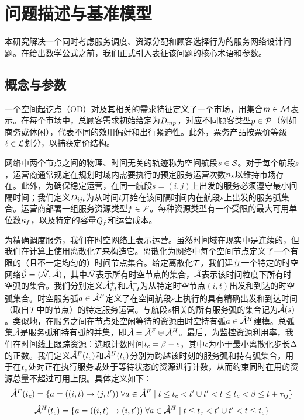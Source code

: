 \chapter{问题描述与基准模型}\label{sec:model_overview}

本研究解决一个同时考虑服务调度、资源分配和顾客选择行为的服务网络设计问题。在给出数学公式之前，我们正式引入表征该问题的核心术语和参数。

\section{概念与参数}

一个空间起讫点（OD）对及其相关的需求特征定义了一个市场，用集合$m \in \mathcal{M}$表示。在每个市场中，总顾客需求初始给定为$D_{mp}$，对应不同顾客类型$p \in \mathcal{P}$（例如商务或休闲），代表不同的效用偏好和出行紧迫性。此外，票务产品按票价等级$\ell \in \mathcal{L}$划分，以捕获定价结构。

网络中两个节点之间的物理、时间无关的轨迹称为空间航段$s \in \mathcal{S}$。对于每个航段$s$，运营商通常规定在规划时域内需要执行的预定服务运营次数$n_s$以维持市场存在。此外，为确保稳定运营，在同一航段$s=(i,j)$上出发的服务必须遵守最小间隔时间；我们定义$D_{ijt}$为从时间$t$开始在该间隔时间内在航段$s$上出发的服务弧集合。运营商部署一组服务资源类型$f \in \mathcal{F}$。每种资源类型有一个受限的最大可用单位数$\kappa_f$，以及特定的容量$Q_{f}$和运营成本。

为精确调度服务，我们在时空网络上表示运营。虽然时间域在现实中是连续的，但我们在计算上使用离散化$\mathcal{T}$来构造它。离散化为网络中每个空间节点定义了一个有限的（且不一定均匀的）时间节点集合。给定离散化$\mathcal{T}$，我们建立一个特定的时空网络$\hat{\mathcal{G}} = (\hat{\mathcal{N}}, \hat{\mathcal{A}})$，其中$\hat{\mathcal{N}}$表示所有时空节点的集合，$\hat{\mathcal{A}}$表示该时间粒度下所有时空弧的集合。我们分别定义${\hat{\mathcal{A}}^{+}_{i,t}}$和${\hat{\mathcal{A}}^{-}_{i,t}}$为从特定时空节点$(i, t)$出发和到达的时空弧集合。时空服务弧$a \in {\hat{\mathcal{A}}^F_{{}}}$定义了在空间航段$s$上执行的具有精确出发和到达时间（取自$\mathcal{T}$中的节点）的特定服务运营。与航段$s$相关的所有服务弧的集合记为$\hat{\mathcal{A}}(s)$。类似地，在服务之间在节点处空闲等待的资源由时空持有弧$a \in {\hat{\mathcal{A}}^H_{{}}}$建模。总弧集$\hat{\mathcal{A}}$是服务弧和持有弧的并集，即$\hat{\mathcal{A}} = {\hat{\mathcal{A}}^F_{{}}} \uplus {\hat{\mathcal{A}}^H_{{}}}$。最后，为监控资源利用率，我们在时间线上跟踪资源：选取计数时间$t_c = \beta - \epsilon$，其中$\epsilon$为小于最小离散化步长$\Delta$的正数。我们定义${\hat{\mathcal{A}}^F(t_c)}$和${\hat{\mathcal{A}}^H(t_c)}$分别为跨越该时刻的服务弧和持有弧集合，用于在$t_c$处对正在执行服务或处于等待状态的资源进行计数，从而约束同时在用的资源总量不超过可用上限。具体定义如下：
\begin{equation}
    {\hat{\mathcal{A}}^F(t_c)} = 
    \{a=((i,t)\rightarrow(j,t^\prime))\;\forall a\in{\hat{\mathcal{A}}^F_{{}}}\mid t\leq t_c<t^\prime\cup t^\prime<t\leq t_c<\beta\leq t+\tau_{ij}\}
    \label{def:main.flightArcTc}
\end{equation}
\begin{equation}
    {\hat{\mathcal{A}}^H(t_c)} = 
    \{a=((i,t)\rightarrow(i,t^\prime))\;\forall a\in{\hat{\mathcal{A}}^H_{{}}}\mid t\leq t_c<t^\prime\cup t^\prime<t\leq t_c\}
    \label{def:main.holdingArcTc}
\end{equation}

